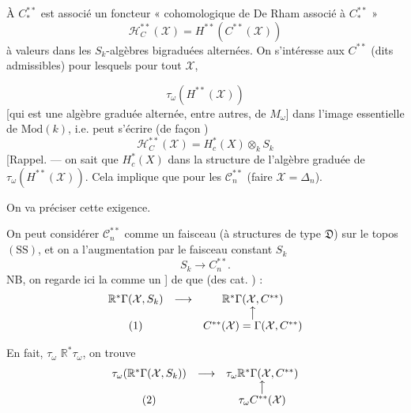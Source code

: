 \documentclass[11pt,a4paper]{article}
\begin{document}
À $C^{**}_{*}$ est associé un foncteur « cohomologique de De Rham associé à $C^{**}_{*}$ »
\[
\mathcal{H}^{**}_{C}(\mathcal{X}) = H^{**}(C^{**}(\mathcal{X}))
\]
à valeurs dans les $S_k$-algèbres bigraduées alternées. On s'intéresse aux $C^{**}$  (dits admissibles) pour lesquels pour tout $\mathcal{X}$,

\[
\tau_{\omega}(H^{**}(\mathcal{X}))
\]
[qui est une algèbre graduée \struck{\ill{}} alternée, entre autres, de $M_{\omega}$]   dans l'image essentielle de $\mathrm{Mod}(k)$, i.e. peut s'écrire (de façon \ill{} \ill{} \ill{}  \ill{})
\[
\mathcal{H}^{**}_{C}(\mathcal{X}) = H^{*}_{c}(X) \otimes_k S_k
\]
[Rappel. — on sait que $H^{*}_{c}(X)$  dans la structure de l'algèbre graduée de $\tau_{\omega}(H^{**}(\mathcal{X}))$. Cela implique que pour les $\mathcal{C}^{**}_{n}$ \ill{}   (faire $\mathcal{X} = \Delta_n$).

 On va préciser cette exigence.

On peut considérer $\mathcal{C}^{**}_{n}$ comme un faisceau (à structures de type $\mathfrak{D}$) sur le topos $(\mathrm{SS})$, et on a l'augmentation par le faisceau constant $S_k$
\[
S_k \to C^{**}_{n} .
\]
\ill{} NB, on regarde ici la   \ill{} comme un \ill{} ] de  que \struck{\ill{}}  \ill{} (des \struck{\ill{}} cat.  \struck{\ill{}})  :
\[
\begin{array}{ccc}
\mathbb{R}^{*}\Gamma(\mathcal{X}, S_k) & \longrightarrow & \mathbb{R}^{*}\Gamma(\mathcal{X}, C^{**}) \\
 & & \big\uparrow \\
(1) & & C^{**}(\mathcal{X}) = \Gamma(\mathcal{X}, C^{**})
\end{array}
\]

En fait,  \ill{}  $\tau_{\omega}$  $\mathbb{R}^{*}\tau_{\omega}$, on trouve
\[
\begin{array}{ccc}
\tau_{\omega}(\mathbb{R}^{*}\Gamma(\mathcal{X}, S_k)) & \longrightarrow & \tau_{\omega}\mathbb{R}^{*}\Gamma(\mathcal{X}, C^{**}) \\
 & & \big\uparrow \\
(2) & & \tau_{\omega} C^{**}(\mathcal{X})
\end{array}
\]
\end{document}
